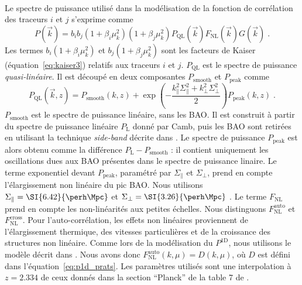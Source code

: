 \paragraph{}
Le spectre de puissance utilisé dans la modélisation de la fonction de corrélation des traceurs $i$ et $j$ s'exprime comme
\begin{equation}
  \label{eq:pk_model1}
  P(\vec k) = b_i b_j (1+\beta_i \mu_k^2)(1+\beta_j \mu_k^2) P_{\mathrm{QL}}(\vec k) F_{\mathrm{NL}}(\vec k) G(\vec k) \; .
\end{equation}
Les termes $b_i (1+\beta_i \mu_k^2)$ et $b_j (1+\beta_j \mu_k^2)$ sont les facteurs de Kaiser (équation~\ref{eq:kaiser3}) relatifs aux traceurs $i$ et $j$.
$P_{\mathrm{QL}}$ est le spectre de puissance \emph{quasi-linéaire}. Il est découpé en deux composantes $P_{\mathrm{smooth}}$ et $P_{\mathrm{peak}}$ comme
\begin{equation}
  \label{
    eq:pk_ql}
  P_{\mathrm{QL}}(\vec k, z) = P_{\mathrm{smooth}}(k, z) + \exp(- \frac{k_{\parallel}^2 \Sigma_{\parallel}^2 + k_{\perp}^2 \Sigma_{\perp}^2}{2}) P_{\mathrm{peak}}(k,z) \; .
\end{equation}
$P_{\mathrm{smooth}}$ est le spectre de puissance linéaire, sans les BAO. Il est construit à partir du spectre de puissance linéaire $P_{\mathrm{L}}$ donné par Camb, puis les BAO sont retirées en utilisant la technique \emph{side-band} décrite dans \textcite{Kirkby2013}.
Le spectre de puissance $P_{\mathrm{peak}}$ est alors obtenu comme la différence $P_{\mathrm{L}} - P_{\mathrm{smooth}}$ : il contient uniquement les oscillations dues aux BAO présentes dans le spectre de puissance linaire.
Le terme exponentiel devant $P_{\mathrm{peak}}$, paramétré par $\Sigma_{\parallel}$ et $\Sigma_{\perp}$, prend en compte l'élargissement non linéaire du pic BAO. Nous utilisons $\Sigma_{\parallel} = \SI{6.42}{\perh\Mpc}$ et $\Sigma_{\perp} = \SI{3.26}{\perh\Mpc}$  \autocite{eisenstein_robustness_2007}.
Le terme $F_{\mathrm{NL}}$ prend en compte les non-linéarités aux petites échelles. Nous distinguons $F_{\mathrm{NL}}^{\mathrm{auto}}$ et $F_{\mathrm{NL}}^{\mathrm{cross}}$. Pour l'auto-corrélation, les effets non linéaires proviennent de l'élargissement thermique, des vitesses particulières et de la croissance des structures non linéaire.
Comme lors de la modélisation du $P^{\mathrm{1D}}$, nous utilisons le modèle décrit dans \textcite{Arinyo-i-Prats2015}. Nous avons donc $F_{\mathrm{NL}}^{\mathrm{auto}}(k, \mu) = D(k, \mu)$, où $D$ est défini dans l'équation~\ref{eq:p1d_prats}. Les paramètres utilisés sont une interpolation à $z = \num{2.334}$ de ceux donnés dans la section ``Planck'' de la table 7 de \textcite{Arinyo-i-Prats2015}.
